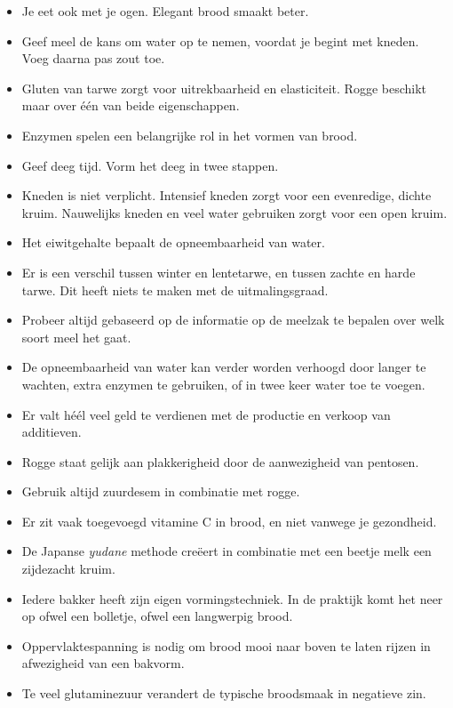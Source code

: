 \documentclass[
  11pt,
  dutch,
]{memoir}
\providecommand{\tightlist}{%
  \setlength{\itemsep}{0pt}\setlength{\parskip}{0pt}}
\begin{document}
\begin{itemize}
\tightlist
\item
  Je eet ook met je ogen. Elegant brood smaakt beter.
\item
  Geef meel de kans om water op te nemen, voordat je begint met kneden.
  Voeg daarna pas zout toe.
\item
  Gluten van tarwe zorgt voor uitrekbaarheid en elasticiteit. Rogge
  beschikt maar over één van beide eigenschappen.
\item
  Enzymen spelen een belangrijke rol in het vormen van brood.
\item
  Geef deeg tijd. Vorm het deeg in twee stappen.
\item
  Kneden is niet verplicht. Intensief kneden zorgt voor een evenredige,
  dichte kruim. Nauwelijks kneden en veel water gebruiken zorgt voor een
  open kruim.
\item
  Het eiwitgehalte bepaalt de opneembaarheid van water.
\item
  Er is een verschil tussen winter en lentetarwe, en tussen zachte en
  harde tarwe. Dit heeft niets te maken met de uitmalingsgraad.
\item
  Probeer altijd gebaseerd op de informatie op de meelzak te bepalen
  over welk soort meel het gaat.
\item
  De opneembaarheid van water kan verder worden verhoogd door langer te
  wachten, extra enzymen te gebruiken, of in twee keer water toe te
  voegen.
\item
  Er valt héél veel geld te verdienen met de productie en verkoop van
  additieven.
\item
  Rogge staat gelijk aan plakkerigheid door de aanwezigheid van
  pentosen.
\item
  Gebruik altijd zuurdesem in combinatie met rogge.
\item
  Er zit vaak toegevoegd vitamine C in brood, en niet vanwege je
  gezondheid.
\item
  De Japanse \emph{yudane} methode creëert in combinatie met een beetje
  melk een zijdezacht kruim.
\item
  Iedere bakker heeft zijn eigen vormingstechniek. In de praktijk komt
  het neer op ofwel een bolletje, ofwel een langwerpig brood.
\item
  Oppervlaktespanning is nodig om brood mooi naar boven te laten rijzen
  in afwezigheid van een bakvorm.
\item
  Te veel glutaminezuur verandert de typische broodsmaak in negatieve
  zin.
\end{itemize}
\end{document}
